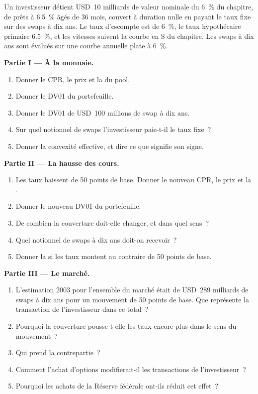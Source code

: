 \begin{problem}\label{pb:m2:mortgages-and-agencies:1}
Un investisseur détient USD~10 milliards de valeur nominale du  6~\% du chapitre,
de prêts à 6.5~\% âgés de 36 mois, couvert à duration nulle en payant le taux fixe
sur des swaps à dix ans. Le taux d'escompte est de 6~\%, le taux hypothécaire primaire
6.5~\%, et les vitesses suivent la courbe en S du chapitre. Les swaps à dix ans sont évalués sur une
courbe annuelle plate à 6~\%.

\medskip\noindent\textbf{Partie I --- À la monnaie.}
\begin{enumerate}
\item Donner le CPR, le prix et la  du pool.
\item Donner le DV01 du portefeuille.
\item Donner le DV01 de USD~100 millions de swap à dix ans.
\item Sur quel notionnel de swaps l'investisseur paie-t-il le taux fixe~?
\item Donner la convexité effective, et dire ce que signifie son signe.
\end{enumerate}

\medskip\noindent\textbf{Partie II --- La hausse des cours.}
\begin{enumerate}[resume]
\item Les taux baissent de 50 points de base. Donner le nouveau CPR, le prix et la .
\item Donner le nouveau DV01 du portefeuille.
\item De combien la couverture doit-elle changer, et dans quel sens~?
\item Quel notionnel de swaps à dix ans doit-on recevoir~?
\item Donner la  si les taux montent au contraire de 50 points de base.
\end{enumerate}

\medskip\noindent\textbf{Partie III --- Le marché.}
\begin{enumerate}[resume]
\item L'estimation 2003 pour l'ensemble du marché était de USD~289 milliards de swaps à dix ans
pour un mouvement de 50 points de base. Que représente la transaction de l'investisseur dans ce total~?
\item Pourquoi la couverture pousse-t-elle les taux encore plus dans le sens du mouvement~?
\item Qui prend la contrepartie~?
\item Comment l'achat d'options modifierait-il les transactions de l'investisseur~?
\item Pourquoi les achats de la Réserve fédérale ont-ils réduit cet effet~?
\end{enumerate}


\end{problem}
